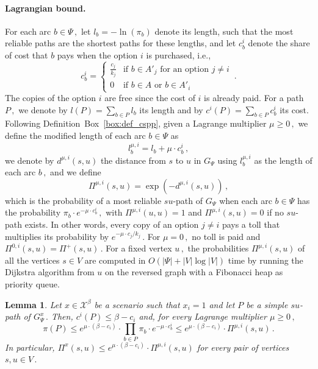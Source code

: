 \documentclass[11pt,a4paper]{report}
\newtheorem{lemma}[theorem]{Lemma}
\theoremstyle{definition}
\theoremstyle{remark}
\begin{document}
\noindent
\paragraph{Lagrangian bound.}
For each arc $b \in \Psi\,,$ let $l_b = -\ln(\pi_b)$ denote its length, such that the most reliable paths are the shortest paths for these lengths, and let $c^i_b$ denote the share of cost that $b$ pays when the option $i$ is purchased, i.e.,
\begin{equation}
  c^i_b=\left\{\begin{array}{ll} \frac{c_j}{k_j} & \text{if $b \in A'_j$ for an option $j \neq i$}\\ 0 & \text{if $b \in A$ or $b \in A'_i$} \end{array} \right.\,.
\end{equation}
The copies of the option $i$ are free since the cost of $i$ is already paid. For a path $P\,,$ we denote by $l(P) = \sum_{b \in P} l_b$ its length and by $c^i(P) = \sum_{b \in P} c^i_b$ its cost. Following Definition~Box~\ref{box:def_cspp}, given a Lagrange multiplier $\mu \geq 0\,,$ we define the modified length of each arc $b \in \Psi$ as
\begin{equation}
  l^{\mu,i}_b = l_b + \mu \cdot c^i_b\,,
\end{equation}
we denote by $d^{\mu,i}(s,u)$ the distance from $s$ to $u$ in $G_\Psi$ using $l^{\mu,i}_b$ as the length of each arc $b\,,$ and we define
\begin{equation}
  \Pi^{\mu,i}(s,u) = \exp\left(-d^{\mu,i}(s,u)\right)\,,
\end{equation}
which is the probability of a most reliable $su$-path of $G_\Psi$ when each arc $b \in \Psi$ has the probability $\pi_b \cdot e^{-\mu \cdot c^i_b}\,,$ with $\Pi^{\mu,i}(u,u) = 1$ and $\Pi^{\mu,i}(s,u) = 0$ if no $su$-path exists. In other words, every copy of an option $j \neq i$ pays a toll that multiplies its probability by $e^{-\mu \cdot c_j / k_j}\,.$ For $\mu = 0\,,$ no toll is paid and $\Pi^{0,i}(s,u) = \Pi^+(s,u)\,.$ For a fixed vertex $u\,,$ the probabilities $\Pi^{\mu,i}(s,u)$ of all the vertices $s \in V$ are computed in $O(|\Psi| + |V| \log |V|)$ time by running the Dijkstra algorithm \cite{DIJKSTRA_1959} from $u$ on the reversed graph with a Fibonacci heap as priority queue.

\begin{lemma}\label{lemma:big_m_lagrangian_bound}
  Let $x \in \mathcal{X}^\beta$ be a scenario such that $x_i = 1$ and let $P$ be a simple $su$-path of $G^x_\Psi\,.$ Then, $c^i(P) \leq \beta - c_i$ and, for every Lagrange multiplier $\mu \geq 0\,,$
  \begin{equation}
    \pi(P) \leq e^{\mu \cdot (\beta - c_i)} \cdot \prod_{b \in P} \pi_b \cdot e^{-\mu \cdot c^i_b} \leq e^{\mu \cdot (\beta - c_i)} \cdot \Pi^{\mu,i}(s,u)\,.
  \end{equation}
  In particular, $\Pi^x(s,u) \leq e^{\mu \cdot (\beta - c_i)} \cdot \Pi^{\mu,i}(s,u)$ for every pair of vertices $s,u \in V\,.$
\end{lemma}
\end{document}

